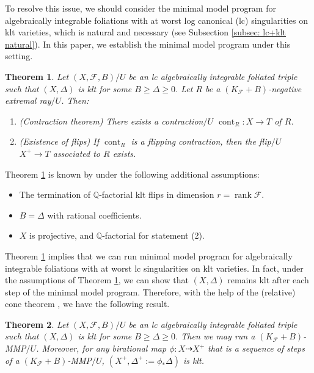 \documentclass[11pt]{amsart}
\numberwithin{equation}{section}
\newcommand{\Qq}{\mathbb{Q}}
\newcommand{\rk}{\operatorname{rank}}
\newcommand{\cont}{\operatorname{cont}}
\newcommand{\Ff}{\mathcal{F}}
\newtheorem{thm}{Theorem}[section]
\theoremstyle{definition}
\theoremstyle{definition}
\theoremstyle{definition}
\begin{document}
To resolve this issue, we should consider the minimal model program for algebraically integrable foliations with at worst log canonical (lc) singularities on klt varieties, which is natural and necessary (see Subsection \ref{subsec: lc+klt natural}). In this paper, we establish the minimal model program under this setting.
\begin{thm}\label{thm: main}
Let $(X,\Ff,B)/U$ be an lc algebraically integrable foliated triple such that $(X,\Delta)$ is klt for some $B\geq\Delta\geq 0$. Let $R$ be a $(K_{\Ff}+B)$-negative extremal ray$/U$. Then:
    \begin{enumerate}
        \item (Contraction theorem) There exists a contraction$/U$ $\cont_R: X\rightarrow T$ of $R$.
        \item (Existence of flips) If $\cont_R$ is a flipping contraction, then the flip$/U$ $X^+\rightarrow T$ associated to $R$ exists.
    \end{enumerate}   
\end{thm}
Theorem \ref{thm: main} is known by \cite[Theorem 3.2]{CS23a} under the following additional assumptions:
\begin{itemize}
        \item The termination of $\Qq$-factorial klt flips in dimension $r=\rk\Ff$. 
        \item $B=\Delta$ with rational coefficients.
        \item $X$ is projective, and $\Qq$-factorial for statement (2).
\end{itemize}

Theorem \ref{thm: main} implies that we can run minimal model program for algebraically integrable foliations with at worst lc singularities on klt varieties. In fact, under the assumptions of Theorem \ref{thm: main}, we can show that $(X,\Delta)$ remains klt after each step of the minimal model program. Therefore, with the help of the (relative) cone theorem \cite{ACSS21,CHLX23}, we have the following result.

\begin{thm}\label{thm: mmp can run}
   Let $(X,\Ff,B)/U$ be an lc algebraically integrable foliated triple such that $(X,\Delta)$ is klt for some $B\geq\Delta\geq 0$. Then we may run a $(K_{\Ff}+B)$-MMP$/U$. Moreover, for any birational map $\phi: X\dashrightarrow X^+$ that is a sequence of steps of a $(K_{\Ff}+B)$-MMP$/U$, $(X^+,\Delta^+:=\phi_*\Delta)$ is klt.
\end{thm}
\end{document}
